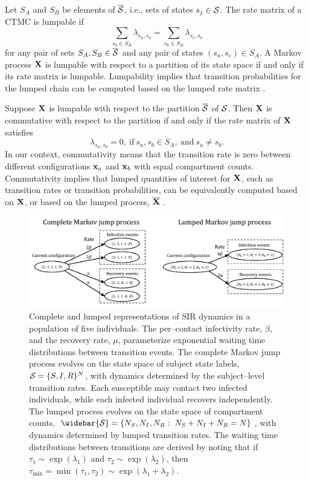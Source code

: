 Let $ S_A $ and $ S_B $ be elements of $ \overline{\mathcal{S}} $, i.e., sets of states $ s_j \in \mathcal{S} $. The rate matrix of a CTMC is lumpable if
\begin{equation*}
\sum_{s_b \in S_B}\lambda_{s_a,s_b} = \sum_{s_b \in S_B}\lambda_{s_c,s_b}
\end{equation*}
for any pair of sets $S_A,S_B \in \overline{\mathcal{S}} $ and any pair of states  $(s_a, s_c) \in S_A$. A Markov process $ \mathbf{X} $ is lumpable with respect to a partition of its state space if and only if its rate matrix is lumpable. Lumpability implies that transition probabilities for the lumped chain can be computed based on the lumped rate matrix  \cite{tian2006lumpability}.

Suppose $ \mathbf{X} $ is lumpable with respect to the partition $ \overline{\mathcal{S}} $ of $ \mathcal{S} $. Then $ \mathbf{X} $ is commutative with respect to the partition if and only if the rate matrix of $ \mathbf{X} $ satisfies
$$\lambda_{s_a,s_b} = 0,\ \text{if}\ s_a,s_b\in S_A,\ \text{and}\ s_a\neq s_b. $$ In our context, commutativity means that the transition rate is zero between different configurations $ \mathbf{x}_a $ and $ \mathbf{x}_b $ with equal compartment counts. Commutativity implies that lumped quantities of interest for $ \mathbf{X} $, such as transition rates or transition probabilities, can be equivalently computed based on $ \mathbf{X} $, or based on the lumped process, $ \overline{\mathbf{X}} $ \cite{tian2006lumpability}. 

\begin{figure}
	\centering
	\includegraphics[width=\linewidth]{figures/SIR_representations}
	\caption[Individual and lumped representations of SIR dynamics.]{Complete and lumped representations of SIR dynamics in a population of five individuals. The per--contact infectivity rate, $ \beta $, and the recovery rate, $ \mu $, parameterize exponential waiting time distributions between transition events. The complete Markov jump process evolves on the state space of subject state labels, $ \mathcal{S} = \lbrace S,I,R\rbrace^N $, with dynamics determined by the subject--level transition rates. Each susceptible may contact two infected individuals, while each infected individual recovers independently. The lumped process evolves on the state space of compartment counts, $ \widebar{\mcS} = \lbrace N_S,N_I,N_R:\ N_S + N_I+N_R=N\rbrace $, with dynamics determined by lumped transition rates. The waiting time distributions between transitions are derived by noting that if $ \tau_1\sim \exp(\lambda_1) $ and $ \tau_2\sim\exp(\lambda_2) $, then $ \tau_{\min} = \min(\tau_1,\tau_2)\sim\exp(\lambda_1+\lambda_2) $.}
	\label{fig:sirrepresentations}
\end{figure}

